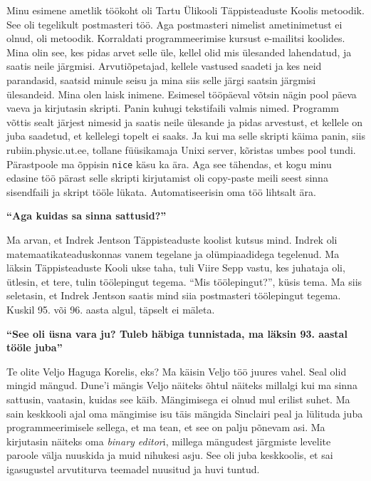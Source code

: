 Minu esimene ametlik töökoht oli Tartu Ülikooli Täppisteaduste
Koolis metoodik. See oli tegelikult
postmasteri töö. Aga postmasteri nimelist ametinimetust ei olnud, oli metoodik.
Korraldati programmeerimise kursust e-mailitsi koolides. Mina olin see, kes
pidas arvet selle üle, kellel olid mis ülesanded lahendatud, ja saatis neile
järgmisi. Arvutiõpetajad, kellele vastused saadeti ja kes neid parandasid,
saatsid minule seisu ja mina siis selle järgi saatsin järgmisi ülesandeid. Mina
olen laisk inimene. Esimesel tööpäeval võtsin nägin pool päeva vaeva ja
kirjutasin skripti. Panin kuhugi tekstifaili valmis nimed. Programm võttis
sealt järjest nimesid ja saatis neile ülesande ja pidas arvestust, et kellele
on juba saadetud, et kellelegi topelt ei saaks. Ja kui ma selle skripti käima
panin, siis rubiin.physic.ut.ee, tollane
füüsikamaja Unixi server, kõristas umbes pool tundi. Pärastpoole ma õppisin
\verb|nice| käsu ka ära. Aga see tähendas, et kogu minu edasine töö
pärast selle skripti kirjutamist oli copy-paste meili seest sinna sisendfaili
ja skript tööle lükata. Automatiseerisin oma töö lihtsalt ära.

\textbf{\enquote{Aga kuidas sa sinna sattusid?}}

Ma arvan, et Indrek Jentson Täppisteaduste koolist
kutsus mind. Indrek oli matemaatikateaduskonnas vanem tegelane ja
olümpiaadidega tegelenud. Ma läksin Täppisteaduste Kooli ukse taha, tuli Viire
Sepp vastu, kes juhataja oli, ütlesin, et tere, tulin
töölepingut tegema. \enquote{Mis töölepingut?}, küsis tema. Ma siis seletasin,
et Indrek Jentson saatis mind siia postmasteri töölepingut tegema. Kuskil 95.
või 96. aasta algul, täpselt ei mäleta.

\textbf{\enquote{See oli üsna vara ju? Tuleb häbiga tunnistada, ma läksin 93.
aastal tööle juba}}

Te olite Veljo Haguga Korelis, eks? Ma
käisin Veljo töö juures vahel. Seal olid mingid mängud.
Dune'i mängis Veljo näiteks õhtul näiteks millalgi kui ma
sinna sattusin, vaatasin, kuidas see käib. Mängimisega ei olnud mul erilist
suhet. Ma sain keskkooli ajal oma mängimise isu täis mängida Sinclairi peal ja
lülituda juba programmeerimisele sellega, et ma tean, et see on palju põnevam
asi. Ma kirjutasin näiteks oma \emph{binary editor}i, millega mängudest
järgmiste levelite paroole välja nuuskida ja muid nihukesi asju. See oli juba
keskkoolis, et sai igasugustel arvutiturva teemadel nuusitud ja huvi tuntud.

